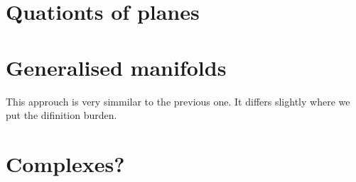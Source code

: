 \section{Quationts of planes}

\section{Generalised manifolds}
This approuch is very simmilar to the previous one. It differs slightly where we put the 
difinition burden. 

\section{Complexes?}

